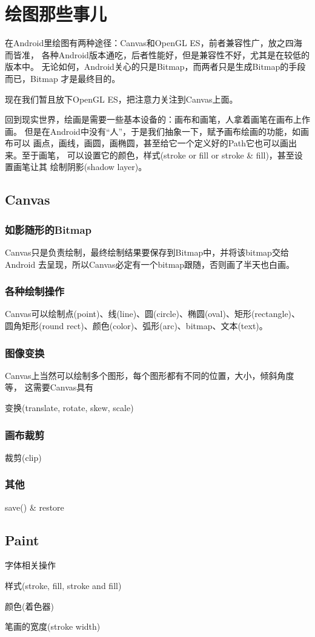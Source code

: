 \section[绘图那些事儿]{绘图那些事儿}
在Android里绘图有两种途径：Canvas和OpenGL ES，前者兼容性广，放之四海而皆准，
各种Android版本通吃，后者性能好，但是兼容性不好，尤其是在较低的版本中。
无论如何，Android关心的只是Bitmap，而两者只是生成Bitmap的手段而已，Bitmap
才是最终目的。

现在我们暂且放下OpenGL ES，把注意力关注到Canvas上面。

回到现实世界，绘画是需要一些基本设备的：画布和画笔，人拿着画笔在画布上作画。
但是在Android中没有“人”，于是我们抽象一下，赋予画布绘画的功能，如画布可以
画点，画线，画圆，画椭圆，甚至给它一个定义好的Path它也可以画出来。至于画笔，
可以设置它的颜色，样式(stroke or fill or stroke \& fill)，甚至设置画笔让其
绘制阴影(shadow layer)。

\subsection[Canvas]{Canvas}
\subsubsection[如影随形的Bitmap]{如影随形的Bitmap}
Canvas只是负责绘制，最终绘制结果要保存到Bitmap中，并将该bitmap交给Android
去呈现，所以Canvas必定有一个bitmap跟随，否则画了半天也白画。

\subsubsection[各种绘制操作]{各种绘制操作}
Canvas可以绘制点(point)、线(line)、圆(circle)、椭圆(oval)、矩形(rectangle)、
圆角矩形(round rect)、颜色(color)、弧形(arc)、bitmap、文本(text)。

\subsubsection[图像变换]{图像变换}
Canvas上当然可以绘制多个图形，每个图形都有不同的位置，大小，倾斜角度等，
这需要Canvas具有

变换(translate, rotate, skew, scale)

\subsubsection[画布裁剪]{画布裁剪}
裁剪(clip)

\subsubsection[其他]{其他}
save() \& restore

\subsection[Paint]{Paint}

字体相关操作

样式(stroke, fill, stroke and fill)

颜色(着色器)

笔画的宽度(stroke width)

